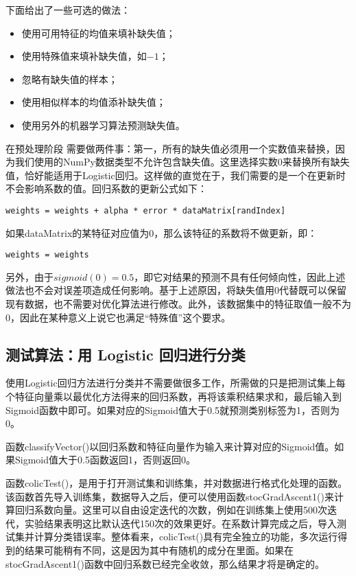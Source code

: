 下面给出了一些可选的做法：
\begin{itemize}
    \item 使用可用特征的均值来填补缺失值；
    \item 使用特殊值来填补缺失值，如$-1$；
    \item 忽略有缺失值的样本；
    \item 使用相似样本的均值添补缺失值；
    \item 使用另外的机器学习算法预测缺失值。
\end{itemize}

在预处理阶段
需要做两件事：第一，所有的缺失值必须用一个实数值来替换，因为我们使用的NumPy数据类型不允许包含缺失值。这里选择实数0来替换所有缺失值，恰好能适用于Logistic回归。这样做的直觉在于，我们需要的是一个在更新时不会影响系数的值。回归系数的更新公式如下：

\verb|weights = weights + alpha * error * dataMatrix[randIndex]|

如果dataMatrix的某特征对应值为0，那么该特征的系数将不做更新，即：

\verb|weights = weights|

另外，由于$sigmoid(0)=0.5$，即它对结果的预测不具有任何倾向性，因此上述做法也不会对误差项造成任何影响。基于上述原因，将缺失值用0代替既可以保留现有数据，也不需要对优化算法进行修改。此外，该数据集中的特征取值一般不为0，因此在某种意义上说它也满足“特殊值”这个要求。


\subsection{测试算法：用 Logistic 回归进行分类}
使用Logistic回归方法进行分类并不需要做很多工作，所需做的只是把测试集上每个特征向量乘以最优化方法得来的回归系数，再将该乘积结果求和，最后输入到Sigmoid函数中即可。如果对应的Sigmoid值大于0.5就预测类别标签为1，否则为0。

函数classifyVector()以回归系数和特征向量作为输入来计算对应的Sigmoid值。如果Sigmoid值大于0.5函数返回1，否则返回0。

函数colicTest()，是用于打开测试集和训练集，并对数据进行格式化处理的函数。该函数首先导入训练集，数据导入之后，便可以使用函数stocGradAscent1()来计算回归系数向量。这里可以自由设定迭代的次数，例如在训练集上使用500次迭代，实验结果表明这比默认迭代150次的效果更好。在系数计算完成之后，导入测试集并计算分类错误率。整体看来，colicTest()具有完全独立的功能，多次运行得到的结果可能稍有不同，这是因为其中有随机的成分在里面。如果在stocGradAscent1()函数中回归系数已经完全收敛，那么结果才将是确定的。

